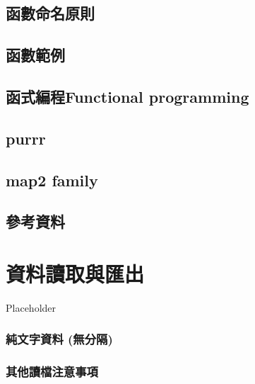 \documentclass[
]{book}
\begin{document}
\hypertarget{ux51fdux6578ux547dux540dux539fux5247}{%
\section{函數命名原則}\label{ux51fdux6578ux547dux540dux539fux5247}}

\hypertarget{ux51fdux6578ux7bc4ux4f8b}{%
\section{函數範例}\label{ux51fdux6578ux7bc4ux4f8b}}

\hypertarget{ux51fdux5f0fux7de8ux7a0bfunctional-programming}{%
\section{函式編程Functional programming}\label{ux51fdux5f0fux7de8ux7a0bfunctional-programming}}

\hypertarget{purrr}{%
\section{purrr}\label{purrr}}

\hypertarget{map2-family}{%
\section{map2 family}\label{map2-family}}

\hypertarget{ux53c3ux8003ux8cc7ux6599}{%
\section{參考資料}\label{ux53c3ux8003ux8cc7ux6599}}

\hypertarget{io}{%
\chapter{資料讀取與匯出}\label{io}}

Placeholder

\hypertarget{ux7d14ux6587ux5b57ux8cc7ux6599-ux7121ux5206ux9694}{%
\subsection{純文字資料 (無分隔)}\label{ux7d14ux6587ux5b57ux8cc7ux6599-ux7121ux5206ux9694}}

\hypertarget{ux5176ux4ed6ux8b80ux6a94ux6ce8ux610fux4e8bux9805}{%
\subsection{其他讀檔注意事項}\label{ux5176ux4ed6ux8b80ux6a94ux6ce8ux610fux4e8bux9805}}
\end{document}

